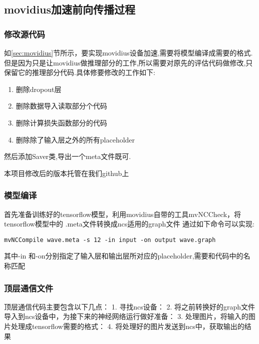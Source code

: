 \subsection{movidius加速前向传播过程}
\subsubsection{修改源代码}

如\ref{sec:movidius}节所示，要实现movidius设备加速,需要将模型编译成需要的格式.
但是因为只是让movidius做推理部分的工作,所以需要对原先的评估代码做修改,只保留它的推理部分代码.具体修要修改的工作如下:
\begin{enumerate}
	\item 删除dropout层
	\item 删除数据导入读取部分个代码
	 \item	删除计算损失函数部分的代码
	 \item	删除除了输入层之外的所有placeholder
\end{enumerate}
然后添加Saver类,导出一个meta文件既可.

本项目修改后的版本托管在我们github\cite{my-nerual-style-tensorflow}上
\subsubsection{模型编译}
首先准备训练好的tensorflow模型，利用movidius自带的工具mvNCCheck，将tensorflow模型中的 .meta文件转换成ncs适用的graph文件
通过如下命令可以实现:
\begin{lstlisting}
mvNCCompile wave.meta -s 12 -in input -on output wave.graph
\end{lstlisting}
其中-in 和-on分别指定了输入层和输出层所对应的placeholder,需要和代码中的名称匹配
\subsubsection{顶层通信文件}
顶层通信代码主要包含以下几点：
1. 寻找ncs设备：
2. 将之前转换好的graph文件导入到ncs设备中，为接下来的神经网络运行做好准备：
3. 处理图片，将输入的图片处理成tensorflow需要的格式：
4. 将处理好的图片发送到ncs中，获取输出的结果
